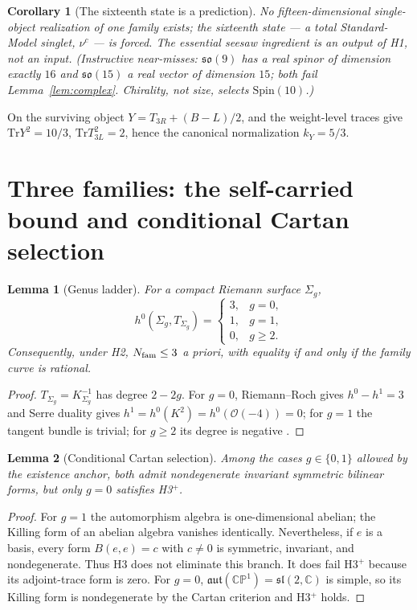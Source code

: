 \documentclass[
  aps,prd,superscriptaddress,nofootinbib,preprint
]{revtex4-2}
\newtheorem{lemma}{Lemma}
\newtheorem{corollary}{Corollary}
\theoremstyle{remark}
\newcommand{\CP}{\mathbb{CP}}
\newcommand{\cO}{\mathcal{O}}
\newcommand{\Spin}{\mathrm{Spin}}
\newcommand{\Tr}{\mathrm{Tr}}
\newcommand{\aut}{\mathfrak{aut}}
\newcommand{\sltwo}{\mathfrak{sl}(2,\mathbb C)}
\begin{document}
\begin{corollary}[The sixteenth state is a prediction]
\label{cor:nuc}
No fifteen-dimensional single-object realization of one family exists;
the sixteenth state --- a total Standard-Model singlet, $\nu^c$ --- is
forced.  The essential seesaw ingredient is an output of H1, not an
input.  (Instructive near-misses: $\mathfrak{so}(9)$ has a \emph{real}
spinor of dimension exactly $16$ and $\mathfrak{so}(15)$ a real vector
of dimension $15$; both fail Lemma~\ref{lem:complex}.  Chirality, not
size, selects $\Spin(10)$.)
\end{corollary}

On the surviving object $Y=T_{3R}+(B-L)/2$, and the weight-level
traces give $\Tr Y^2=10/3$, $\Tr T_{3L}^2=2$, hence the canonical
normalization $k_Y=5/3$.

\section{Three families: the self-carried bound and conditional Cartan
selection}
\label{sec:three}

\begin{lemma}[Genus ladder]
\label{lem:ladder}
For a compact Riemann surface $\Sigma_g$,
\[
  h^0(\Sigma_g,T_{\Sigma_g})=
  \begin{cases} 3, & g=0,\\ 1, & g=1,\\ 0, & g\ge2. \end{cases}
\]
Consequently, under H2, $N_{\rm fam}\le3$ \emph{a priori}, with
equality if and only if the family curve is rational.
\end{lemma}

\begin{proof}
$T_{\Sigma_g}=K^{-1}_{\Sigma_g}$ has degree $2-2g$.  For $g=0$,
Riemann--Roch gives $h^0-h^1=3$ and Serre duality gives
$h^1=h^0(K^2)=h^0(\cO(-4))=0$; for $g=1$ the tangent bundle is trivial;
for $g\ge2$ its degree is negative
\cite{GriffithsHarris1978,LawsonMichelsohn1989}.
\end{proof}

\begin{lemma}[Conditional Cartan selection]
\label{lem:cartan}
Among the cases $g\in\{0,1\}$ allowed by the existence anchor, both
admit nondegenerate invariant symmetric bilinear forms, but only $g=0$
satisfies H3$^+$.
\end{lemma}

\begin{proof}
For $g=1$ the automorphism algebra is one-dimensional abelian; the
Killing form of an abelian algebra vanishes identically.  Nevertheless,
if $e$ is a basis, every form $B(e,e)=c$ with $c\ne0$ is symmetric,
invariant, and nondegenerate.  Thus H3 does not eliminate this branch.
It does fail H3$^+$ because its adjoint-trace form is zero.  For $g=0$,
$\aut(\CP^1)=\sltwo$ is simple, so its Killing form is nondegenerate by
the Cartan criterion and H3$^+$ holds.
\end{proof}
\end{document}
